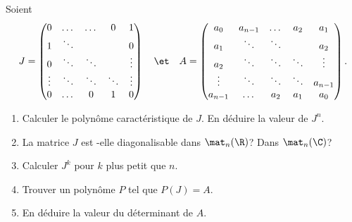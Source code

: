\begin{enonce}
\begin{exercise}[ID={RMS126 E885},subtitle={ENSAM PSI 2015},tags={}, difficulty={0}]
Soient
\begin{equation*}
  J = 
  \begin{pmatrix}
  0      & \dots  & \dots  & 0      & 1      \\
  1      & \ddots &        &        & 0      \\
  0      & \ddots & \ddots &        & \vdots \\
  \vdots & \ddots & \ddots & \ddots & \vdots \\
  0      & \dots  & 0      & 1      & 0      \\ 
  \end{pmatrix}
  \quad\et\quad
  A=
  \begin{pmatrix}
  a_0     & a_{n-1} & \dots  & a_2    & a_1     \\
  a_1     & \ddots  & \ddots &        & a_2     \\
  a_2     & \ddots  & \ddots & \ddots & \vdots  \\
  \vdots  & \ddots  & \ddots & \ddots & a_{n-1} \\
  a_{n-1} & \dots   & a_2    & a_1    & a_0     \\
  \end{pmatrix}.
\end{equation*}
\begin{enumerate}
  \item Calculer le polynôme caractéristique de $J$. En déduire la valeur de $J^n$.
  \item La matrice $J$ est -elle diagonalisable dans $\mat_n(\R)$? Dans $\mat_n(\C)$?
  \item Calculer $J^k$ pour $k$ plus petit que $n$.
  \item Trouver un polynôme $P$ tel que $P(J)=A$.
  \item En déduire la valeur du déterminant de $A$.
\end{enumerate}
\end{exercise}
\begin{solution}
\end{solution}
\end{enonce}
